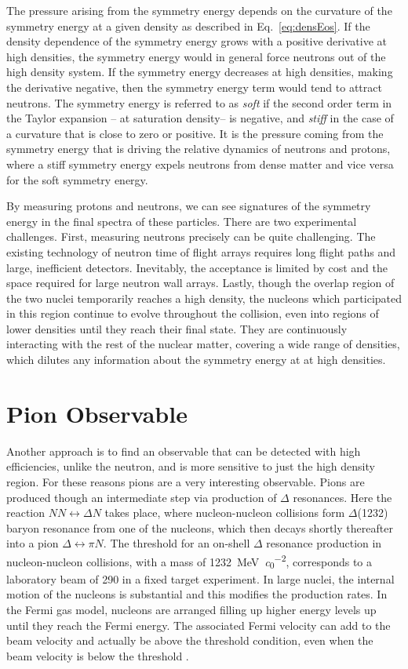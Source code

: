 The pressure arising from the symmetry energy depends on the curvature of the symmetry energy at a given density as described in Eq.~\ref{eq:densEos}. If the density dependence of the symmetry energy grows with a positive derivative at high densities, the symmetry energy would in general force neutrons out of the high density system. If the symmetry energy decreases at high densities, making the derivative  negative, then the symmetry energy term would tend to attract neutrons. The symmetry energy is referred to as \emph{soft} if the second order term in the Taylor expansion -- at saturation density-- is negative, and \emph{stiff} in the case of a curvature that is close to zero or positive. It is the pressure coming from the symmetry energy that is driving the relative dynamics of neutrons and protons, where a stiff symmetry energy expels neutrons from dense matter and vice versa for the soft symmetry energy.

By measuring protons and neutrons, we can see signatures of the symmetry energy in the final spectra of these particles. There are two experimental challenges. First,  measuring neutrons precisely can be quite challenging. The existing technology of neutron time of flight arrays requires long flight paths and large, inefficient detectors. Inevitably, the acceptance is limited by cost and the space required for large neutron wall arrays. Lastly, though the overlap region of the two nuclei temporarily reaches a high density, the nucleons which participated in this region continue to evolve throughout the collision, even into regions of lower densities until they reach their final state. They are continuously interacting with the rest of the nuclear matter, covering a wide range of densities, which dilutes any information about the symmetry energy at at high densities.  




\section{Pion Observable}
\label{sec:pionObs}
Another approach is to find an observable that can be detected with high efficiencies, unlike the neutron, and is more sensitive to just the high density region. For these reasons pions are a very interesting observable. Pions are produced though an intermediate step via production of $\Delta$ resonances. Here the reaction $ NN \leftrightarrow \Delta N$ takes place, where nucleon-nucleon collisions form $\Delta$(1232) baryon resonance from one of the nucleons, which then decays shortly thereafter into a pion $\Delta \leftrightarrow \pi N$. The threshold for  an on-shell $\Delta$ resonance production in nucleon-nucleon collisions, with a mass of \SI{1232}{\mega\electronvolt\per\clight\squared}, corresponds to a laboratory beam of \SI{290}{\MeVA} in a fixed target experiment. In large nuclei, the internal motion of the nucleons is substantial and this modifies the production rates. In the Fermi gas model, nucleons are arranged filling up higher energy levels up until they reach the Fermi energy. The associated Fermi velocity can add to the beam velocity and actually be above the threshold condition, even when the beam velocity is below the threshold \cite{fermiEnergy}.


